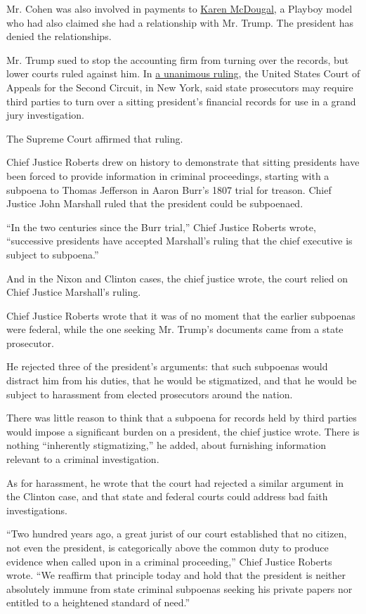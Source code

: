 Mr. Cohen was also involved in payments to
\href{https://www.nytimes.com/2019/12/05/us/fox-news-mcdougal.html}{Karen
McDougal}, a Playboy model who had also claimed she had a relationship
with Mr. Trump. The president has denied the relationships.

Mr. Trump sued to stop the accounting firm from turning over the
records, but lower courts ruled against him. In
\href{https://www.nytimes.com/2019/11/04/nyregion/trump-taxes-vance-appeal.html}{a
unanimous ruling}, the United States Court of Appeals for the Second
Circuit, in New York, said state prosecutors may require third parties
to turn over a sitting president's financial records for use in a grand
jury investigation.

The Supreme Court affirmed that ruling.

Chief Justice Roberts drew on history to demonstrate that sitting
presidents have been forced to provide information in criminal
proceedings, starting with a subpoena to Thomas Jefferson in Aaron
Burr's 1807 trial for treason. Chief Justice John Marshall ruled that
the president could be subpoenaed.

``In the two centuries since the Burr trial,'' Chief Justice Roberts
wrote, ``successive presidents have accepted Marshall's ruling that the
chief executive is subject to subpoena.''

And in the Nixon and Clinton cases, the chief justice wrote, the court
relied on Chief Justice Marshall's ruling.

Chief Justice Roberts wrote that it was of no moment that the earlier
subpoenas were federal, while the one seeking Mr. Trump's documents came
from a state prosecutor.

He rejected three of the president's arguments: that such subpoenas
would distract him from his duties, that he would be stigmatized, and
that he would be subject to harassment from elected prosecutors around
the nation.

There was little reason to think that a subpoena for records held by
third parties would impose a significant burden on a president, the
chief justice wrote. There is nothing ``inherently stigmatizing,'' he
added, about furnishing information relevant to a criminal
investigation.

As for harassment, he wrote that the court had rejected a similar
argument in the Clinton case, and that state and federal courts could
address bad faith investigations.

``Two hundred years ago, a great jurist of our court established that no
citizen, not even the president, is categorically above the common duty
to produce evidence when called upon in a criminal proceeding,'' Chief
Justice Roberts wrote. ``We reaffirm that principle today and hold that
the president is neither absolutely immune from state criminal subpoenas
seeking his private papers nor entitled to a heightened standard of
need.''

